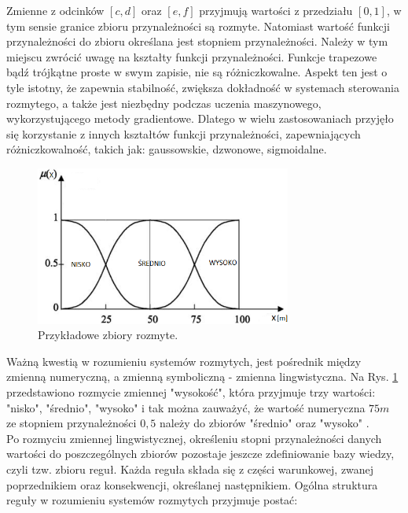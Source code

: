 \newpage

\noindent Zmienne z odcinków $[c,d]$ oraz $[e,f]$ przyjmują wartości z przedziału $[0,1]$, w tym sensie granice zbioru przynależności są rozmyte. Natomiast wartość funkcji przynależności do zbioru określana jest stopniem przynależności. Należy w tym miejscu zwrócić uwagę na kształty funkcji przynależności. Funkcje trapezowe bądź trójkątne proste w swym zapisie, nie są różniczkowalne. Aspekt ten jest o tyle istotny, że zapewnia stabilność, zwiększa dokładność w systemach sterowania rozmytego, a także jest niezbędny podczas uczenia maszynowego, wykorzystującego metody gradientowe. Dlatego w wielu zastosowaniach przyjęło się korzystanie z innych kształtów funkcji przynależności, zapewniających różniczkowalność, takich jak: gaussowskie, dzwonowe, sigmoidalne.

\begin{figure}[h!]
\centering
\includegraphics[width=0.75\textwidth]{pictures/fuzzy_set}
\caption{Przykładowe zbiory rozmyte.}
\label{fuzzy_set}
\end{figure}

Ważną kwestią w rozumieniu systemów rozmytych, jest pośrednik między zmienną numeryczną, a zmienną symboliczną - zmienna lingwistyczna. Na Rys. \ref{fuzzy_set} przedstawiono rozmycie zmiennej "wysokość", która przyjmuje trzy wartości: "nisko", "średnio", "wysoko" i tak można zauważyć, że wartość numeryczna $75m$ ze stopniem przynależności $0,5$ należy do zbiorów "średnio" oraz "wysoko" \cite{90, 120, 130}. \\
Po rozmyciu zmiennej lingwistycznej, określeniu stopni przynależności danych wartości do poszczególnych zbiorów pozostaje jeszcze zdefiniowanie bazy wiedzy, czyli tzw. zbioru reguł. Każda reguła składa się z części warunkowej, zwanej poprzednikiem oraz konsekwencji, określanej następnikiem. Ogólna struktura reguły w rozumieniu systemów rozmytych przyjmuje postać:

